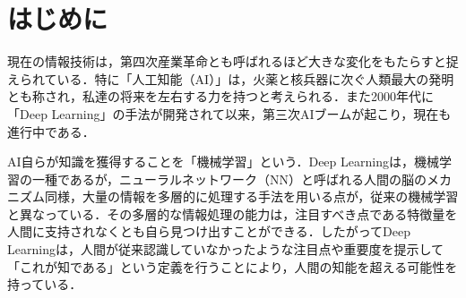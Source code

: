 \documentclass{eithesis}
\begin{document}
\etMakeTitle
\tableofcontents
\clearpage
{}
\pagestyle{fancyplain}
\lhead{\leftmark}  %
\chead{}           %
\rhead{\rightmark} %
\lfoot{}           %
\cfoot{\thepage}   %
\rfoot{}           %

\chapter{はじめに}
	現在の情報技術は，第四次産業革命とも呼ばれるほど大きな変化をもたらすと捉えられている．特に「人工知能（AI）」は，火薬と核兵器に次ぐ人類最大の発明とも称され，私達の将来を左右する力を持つと考えられる．また2000年代に「Deep Learning」の手法が開発されて以来，第三次AIブームが起こり，現在も進行中である．

	AI自らが知識を獲得することを「機械学習」という．Deep Learningは，機械学習の一種であるが，ニューラルネットワーク（NN）と呼ばれる人間の脳のメカニズム同様，大量の情報を多層的に処理する手法を用いる点が，従来の機械学習と異なっている．その多層的な情報処理の能力は，注目すべき点である特徴量を人間に支持されなくとも自ら見つけ出すことができる．したがってDeep Learningは，人間が従来認識していなかったような注目点や重要度を提示して「これが知である」という定義を行うことにより，人間の知能を超える可能性を持っている．\cite{rinri}
\end{document}

